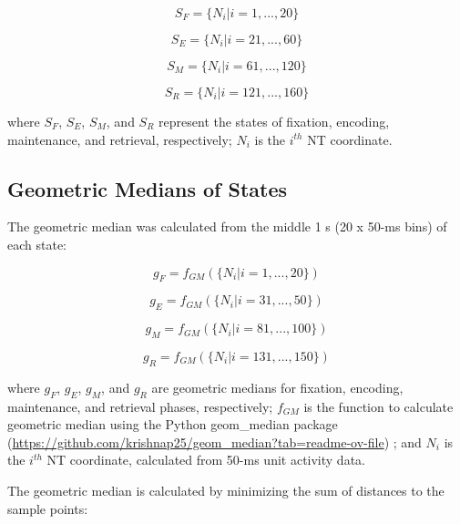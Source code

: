 \begin{equation}
S_F = \{N_{i} | i = 1, ..., 20\}
\end{equation}

\begin{equation}
S_E = \{N_{i} | i = 21, ..., 60\}
\end{equation}

\begin{equation}
S_M = \{N_{i} | i = 61, ..., 120\}
\end{equation}

\begin{equation}
S_R = \{N_{i} | i = 121, ..., 160\}
\end{equation}

where $S_F$, $S_E$, $S_M$, and $S_R$ represent the states of fixation, encoding, maintenance, and retrieval, respectively; $N_{i}$ is the $i^{th}$ NT coordinate.

\subsection{Geometric Medians of States}
The geometric median was calculated from the middle 1 s (20 x 50-ms bins) of each state:

\begin{equation}
g_F = f_{GM}(\{N_{i} | i = 1, ..., 20\})
\end{equation}

\begin{equation}
g_E = f_{GM}(\{N_{i} | i = 31, ..., 50\})
\end{equation}

\begin{equation}
g_M = f_{GM}(\{N_{i} | i = 81, ..., 100\})
\end{equation}

\begin{equation}
g_R = f_{GM}(\{N_{i} | i = 131, ..., 150\})
\end{equation}

where $g_{F}$, $g_{E}$, $g_{M}$, and $g_{R}$ are geometric medians for fixation, encoding, maintenance, and retrieval phases, respectively; $f_{GM}$ is the function to calculate geometric median using the Python geom\_median package (\url{https://github.com/krishnap25/geom_median?tab=readme-ov-file}) \cite{pillutla:etal:rfa}; and $N_{i}$ is the $i^{th}$ NT coordinate, calculated from 50-ms unit activity data.

The geometric median is calculated by minimizing the sum of distances to the sample points:

